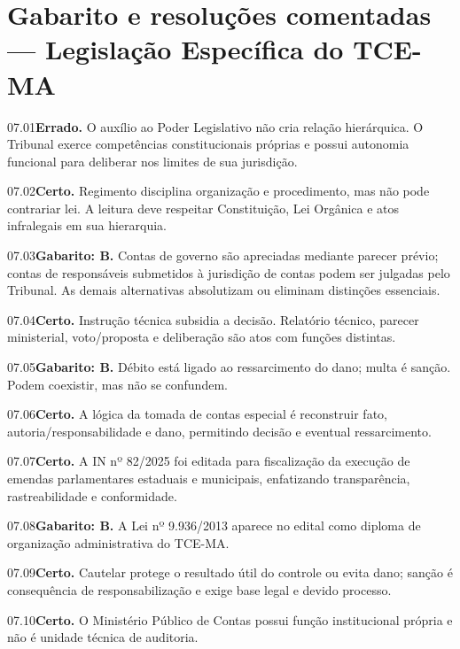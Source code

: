 \section{Gabarito e resoluções comentadas — Legislação Específica do TCE-MA}

\begin{solucao}{07.01}\textbf{Errado.} O auxílio ao Poder Legislativo não cria relação hierárquica. O Tribunal exerce competências constitucionais próprias e possui autonomia funcional para deliberar nos limites de sua jurisdição.\end{solucao}
\begin{solucao}{07.02}\textbf{Certo.} Regimento disciplina organização e procedimento, mas não pode contrariar lei. A leitura deve respeitar Constituição, Lei Orgânica e atos infralegais em sua hierarquia.\end{solucao}
\begin{solucao}{07.03}\textbf{Gabarito: B.} Contas de governo são apreciadas mediante parecer prévio; contas de responsáveis submetidos à jurisdição de contas podem ser julgadas pelo Tribunal. As demais alternativas absolutizam ou eliminam distinções essenciais.\end{solucao}
\begin{solucao}{07.04}\textbf{Certo.} Instrução técnica subsidia a decisão. Relatório técnico, parecer ministerial, voto/proposta e deliberação são atos com funções distintas.\end{solucao}
\begin{solucao}{07.05}\textbf{Gabarito: B.} Débito está ligado ao ressarcimento do dano; multa é sanção. Podem coexistir, mas não se confundem.\end{solucao}
\begin{solucao}{07.06}\textbf{Certo.} A lógica da tomada de contas especial é reconstruir fato, autoria/responsabilidade e dano, permitindo decisão e eventual ressarcimento.\end{solucao}
\begin{solucao}{07.07}\textbf{Certo.} A IN nº 82/2025 foi editada para fiscalização da execução de emendas parlamentares estaduais e municipais, enfatizando transparência, rastreabilidade e conformidade.\end{solucao}
\begin{solucao}{07.08}\textbf{Gabarito: B.} A Lei nº 9.936/2013 aparece no edital como diploma de organização administrativa do TCE-MA.\end{solucao}
\begin{solucao}{07.09}\textbf{Certo.} Cautelar protege o resultado útil do controle ou evita dano; sanção é consequência de responsabilização e exige base legal e devido processo.\end{solucao}
\begin{solucao}{07.10}\textbf{Certo.} O Ministério Público de Contas possui função institucional própria e não é unidade técnica de auditoria.\end{solucao}

